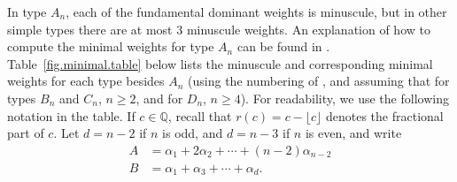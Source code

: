 \documentclass[reqno,11pt]{amsart}
\theoremstyle{remark}
\theoremstyle{remark}
\theoremstyle{definition}
\theoremstyle{definition}
\theoremstyle{definition}
\numberwithin{equation}{section}
\newcommand{\QQ}{\mathbb{ Q}}        %
\begin{document}
In type $A_n$, each of the fundamental dominant weights is minuscule, but in other simple types there are at most $3$ minuscule weights.  An explanation
of how to compute the minimal weights for type $A_n$ can be found in \cite{GPR23}.  Table~\ref{fig.minimal.table} below lists the minuscule and corresponding minimal weights for each type besides $A_n$ (using the numbering of \cite[\S 13.4, Exercise 13]{HumphreysLieAlg}, and assuming that for types $B_n$ and $C_n$, $n \geq 2$, and for $D_n$, $n \geq 4$).  For readability, we use the following notation in the table.  If $c \in \QQ$, recall that $r(c) = c - \lfloor c \rfloor$ denotes the fractional part of $c$.  Let $d = n-2$ if $n$ is odd, and $d = n-3$ if $n$ is even, and write
\begin{align*}
A & =   \alpha_1 + 2\alpha_2 + \cdots + (n-2) \alpha_{n-2} \\
B & = \alpha_1 + \alpha_3 + \cdots + \alpha_{d}.
\end{align*}
\end{document}
